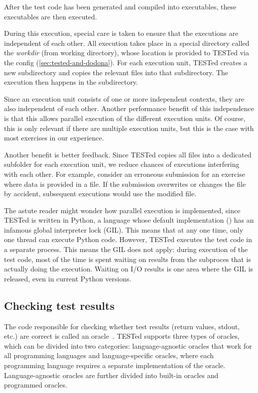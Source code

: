 \documentclass[../main]{subfiles}
\begin{document}
After the test code has been generated and compiled into executables, these executables are then executed.

During this execution, special care is taken to ensure that the executions are independent of each other.
All execution takes place in a special directory called the \emph{workdir} (from working directory), whose location is provided to TESTed via the config (\vref{sec:tested-and-dodona}).
For each execution unit, TESTed creates a new subdirectory and copies the relevant files into that subdirectory.
The execution then happens in the subdirectory.

Since an execution unit consists of one or more independent contexts, they are also independent of each other.
Another performance benefit of this independence is that this allows parallel execution of the different execution units.
Of course, this is only relevant if there are multiple execution units, but this is the case with most exercises in our experience.

Another benefit is better feedback.
Since TESTed copies all files into a dedicated subfolder for each execution unit, we reduce chances of executions interfering with each other.
For example, consider an erroneous submission for an exercise where data is provided in a file.
If the submission overwrites or changes the file by accident, subsequent executions would use the modified file.

The astute reader might wonder how parallel execution is implemented, since TESTed is written in Python, a language whose default implementation () has an infamous global interpreter lock (GIL).
This means that at any one time, only one thread can execute Python code.
However, TESTed executes the test code in a separate process.
This means the GIL does not apply: during execution of the test code, most of the time is spent waiting on results from the subproces that is actually doing the execution.
Waiting on I/O results is one area where the GIL is released, even in current Python versions.

\subsection{Checking test results}\label{subsec:checking-results}

The code responsible for checking whether test results (return values, stdout, etc.) are correct is called an oracle~\autocite{howdenTheoreticalEmpiricalStudies1978}.
TESTed supports three types of oracles, which can be divided into two categories: language-agnostic oracles that work for all programming languages and language-specific oracles, where each programming language requires a separate implementation of the oracle.
Language-agnostic oracles are further divided into built-in oracles and programmed oracles.
\end{document}
